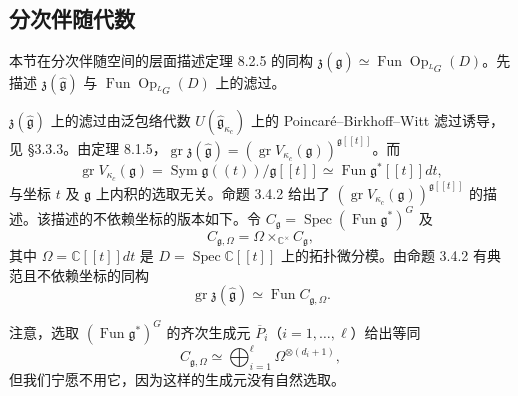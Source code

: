 \subsection{分次伴随代数}

本节在分次伴随空间的层面描述定理 8.2.5 的同构 $\mathfrak z(\hat{\mathfrak g})\simeq\operatorname{Fun}\operatorname{Op}_{{}^LG}(D)$。先描述 $\mathfrak z(\hat{\mathfrak g})$ 与 $\operatorname{Fun}\operatorname{Op}_{{}^LG}(D)$ 上的滤过。

$\mathfrak z(\hat{\mathfrak g})$ 上的滤过由泛包络代数 $U(\hat{\mathfrak g}_{\kappa_c})$ 上的 Poincaré–Birkhoff–Witt 滤过诱导，见 §3.3.3。由定理 8.1.5，$\operatorname{gr}\mathfrak z(\hat{\mathfrak g})=(\operatorname{gr}V_{\kappa_c}(\mathfrak g))^{\mathfrak g[\![t]\!]}$。而
\[
    \operatorname{gr}V_{\kappa_c}(\mathfrak g)=\operatorname{Sym}\mathfrak g((t))/\mathfrak g[\![t]\!]\simeq\operatorname{Fun}\mathfrak g^*[\![t]\!]dt,
\]
与坐标 $t$ 及 $\mathfrak g$ 上内积的选取无关。命题 3.4.2 给出了 $(\operatorname{gr}V_{\kappa_c}(\mathfrak g))^{\mathfrak g[\![t]\!]}$ 的描述。该描述的不依赖坐标的版本如下。令 $C_{\mathfrak g}=\operatorname{Spec}(\operatorname{Fun}\mathfrak g^*)^G$ 及
\[
    C_{\mathfrak g,\Omega}=\Omega\times_{\mathbb C^\times}C_{\mathfrak g},
\]
其中 $\Omega=\mathbb C[\![t]\!]dt$ 是 $D=\operatorname{Spec}\mathbb C[\![t]\!]$ 上的拓扑微分模。由命题 3.4.2 有典范且不依赖坐标的同构
\begin{equation}
    \operatorname{gr}\mathfrak z(\hat{\mathfrak g})\simeq\operatorname{Fun}C_{\mathfrak g,\Omega}.
    \tag{8.2-15}
\end{equation}

注意，选取 $(\operatorname{Fun}\mathfrak g^*)^G$ 的齐次生成元 $\overline P_i$（$i=1,\dots,\ell$）给出等同
\[
    C_{\mathfrak g,\Omega}\simeq\bigoplus_{i=1}^{\ell}\Omega^{\otimes(d_i+1)},
\]
但我们宁愿不用它，因为这样的生成元没有自然选取。

